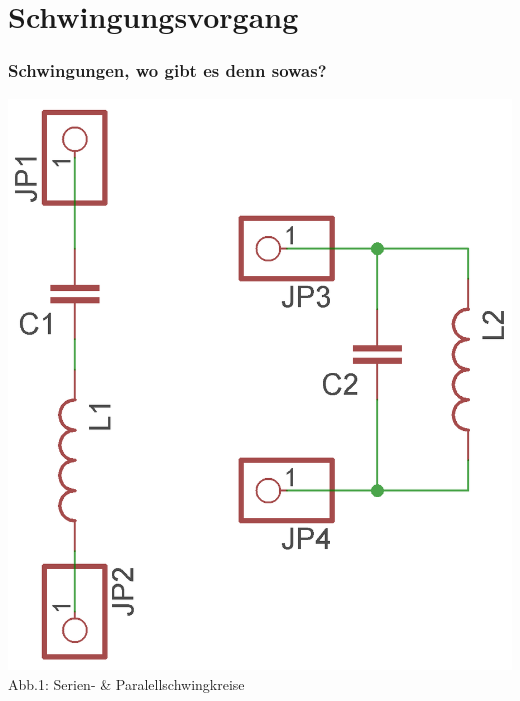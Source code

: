 

\subtitle{Technik Klasse E 07: \\
          Schwingkreise \& Filter \\[2em]}
\date{Stand 20.11.2014}



\section*{Schwingungsvorgang}
\begin{frame}
\frametitle{Schwingungen, wo gibt es denn sowas?}
	\begin{center}
		\includegraphics[scale=1.4]{e07/Schwingkreise.png}\\
		Abb.1: Serien- \& Paralellschwingkreise
	\end{center}
\end{frame}

